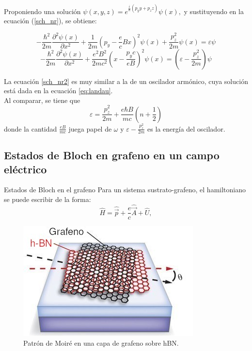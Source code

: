 \begin{frame}
	Proponiendo una solución $\psi(x,y,z) = e^{\frac{i}{\hbar}(p_yy+p_zz)}\psi(x),$
	y sustituyendo en la ecuación (\ref{sch_nr}), se obtiene:

	\begin{equation}
    -\frac{\hbar^2}{2m}\frac{\partial^2\psi(x)}{\partial x^2} + \frac{1}{2m} \left( p_y-\frac{e}{c}Bx \right)^2 \psi(x) + \frac{p_z^2}{2m} \psi(x) = \varepsilon \psi
	\end{equation}
	\begin{equation}
    -\frac{\hbar^2}{2m}\frac{\partial^2\psi(x)}{\partial x^2} + \frac{e^2B^2}{2mc^2} \left( x-\frac{p_yc}{eB} \right)^2 \psi(x)  = \left(\varepsilon -\frac{p_z^2}{2m}\right) \psi
    \label{sch_nr2}
	\end{equation}
\end{frame}

\begin{frame}
	La ecuación \ref{sch_nr2} es muy similar a la de un oscilador armónico, cuya solución está dada en la ecuación \ref{eq:landau}.\\
	Al comparar, se tiene que
	\begin{equation}
    \varepsilon = \frac{p_z^2}{2m} + \frac{e\hbar B}{mc}\left(n+\frac{1}{2}\right)
	\end{equation}
	donde la cantidad $\frac{eB}{mc}$ juega papel de $\omega$  y $\varepsilon -\frac{p_z^2}{2m}$ es la energía del oscilador.
\end{frame}

\subsection{Estados de Bloch en grafeno en un campo eléctrico}

\begin{frame}{Estados de Bloch en el grafeno}
	Para un sistema sustrato-grafeno, el hamiltoniano se puede escribir de la forma:
	\begin{equation}
			\hat{H} = \hat{\vec{p}}+\frac{e}{c}\hat{\vec{A}} + \hat{U},
	\end{equation}

	\begin{figure}[t]
		\centering
		\includegraphics[scale=0.4]{graficas/Moire.jpg}
		\caption{Patrón de Moiré en una capa de grafeno sobre hBN.}
		\label{moire}
	\end{figure}
\end{frame}

